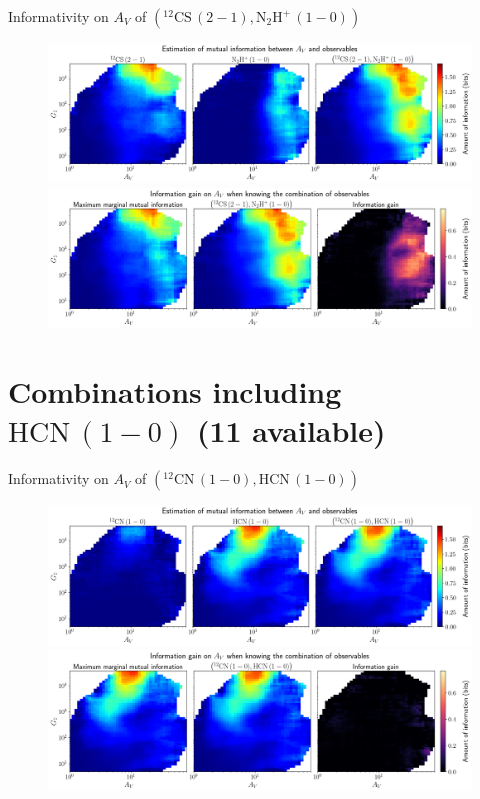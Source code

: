 \documentclass{beamer}
\begin{document}
\begin{frame}{Informativity on $A_V$ of $\left(\mathrm{^{12}CS\,(2-1)},\mathrm{N_2H^+\,(1-0)}\right)$}
    \begin{figure}
        \centering
        \includegraphics[width=0.95\linewidth]{../mi/av__12cs21_n2hp10_mi.png}
        \vfill
        \includegraphics[width=0.95\linewidth]{../mi/av__12cs21_n2hp10_mi_gain.png}
    \end{figure}
\end{frame}

\section{Combinations including $\mathrm{HCN\,(1-0)}$ (11 available)}

\begin{frame}{Informativity on $A_V$ of $\left(\mathrm{^{12}CN\,(1-0)},\mathrm{HCN\,(1-0)}\right)$}
    \begin{figure}
        \centering
        \includegraphics[width=0.95\linewidth]{../mi/av__12cn10_hcn10_mi.png}
        \vfill
        \includegraphics[width=0.95\linewidth]{../mi/av__12cn10_hcn10_mi_gain.png}
    \end{figure}
\end{frame}
\end{document}
